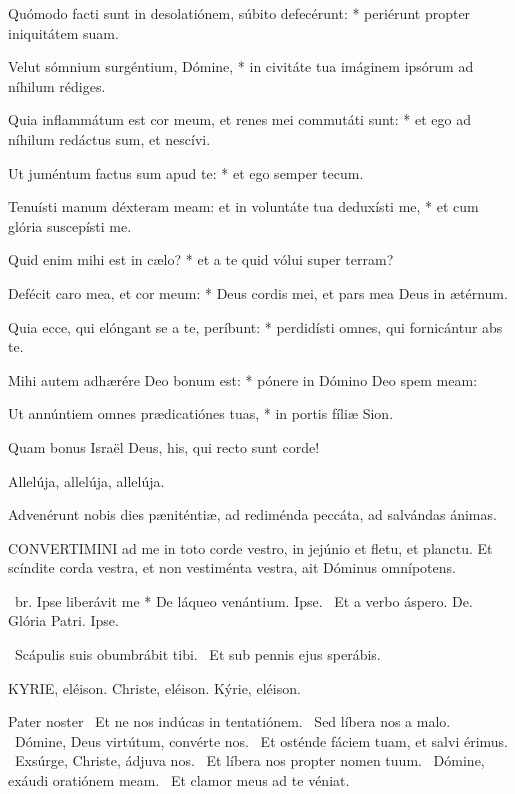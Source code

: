 Quómodo facti sunt in desolatiónem, súbito defecérunt: * periérunt propter iniquitátem suam.

Velut sómnium surgéntium, Dómine, * in civitáte tua imáginem ipsórum ad níhilum rédiges.

Quia inflammátum est cor meum, et renes mei commutáti sunt: * et ego ad níhilum redáctus sum, et nescívi.

Ut juméntum factus sum apud te: * et ego semper tecum.

Tenuísti manum déxteram meam: et in voluntáte tua deduxísti me, * et cum glória suscepísti me.

Quid enim mihi est in cælo? * et a te quid vólui super terram?

Defécit caro mea, et cor meum: * Deus cordis mei, et pars mea Deus in ætérnum.

Quia ecce, qui elóngant se a te, períbunt: * perdidísti omnes, qui fornicántur abs te.

Mihi autem adhærére Deo bonum est: * pónere in Dómino Deo spem meam:

Ut annúntiem omnes prædicatiónes tuas, * in portis fíliæ Sion.

  Quam bonus Israël Deus, his, qui recto sunt corde!

  Allelúja, allelúja, allelúja.



 Advenérunt nobis dies pæniténtiæ, ad rediménda peccáta, ad salvándas ánimas.


\lettrine[lines=2]{C}{ONVERTIMINI} ad me in toto corde vestro, in jejúnio et fletu, et planctu. Et scíndite corda vestra, et non vestiménta vestra, ait Dóminus omnípotens.

\R\ br. Ipse liberávit me * De láqueo venántium. Ipse. \V\ Et a verbo áspero. De. Glória Patri. Ipse.

\V\ Scápulis suis obumbrábit tibi. \R\ Et sub pennis ejus sperábis.


KYRIE, eléison. Christe, eléison. Kýrie, eléison.

Pater noster  \V\ Et ne nos indúcas in tentatiónem. \R\ Sed líbera nos a malo. \V\ Dómine, Deus virtútum, convérte nos. \R\ Et osténde fáciem tuam, et salvi érimus. \V\ Exsúrge, Christe, ádjuva nos. \R\ Et líbera nos propter nomen tuum. \V\ Dómine, exáudi oratiónem meam. \R\ Et clamor meus ad te véniat.

